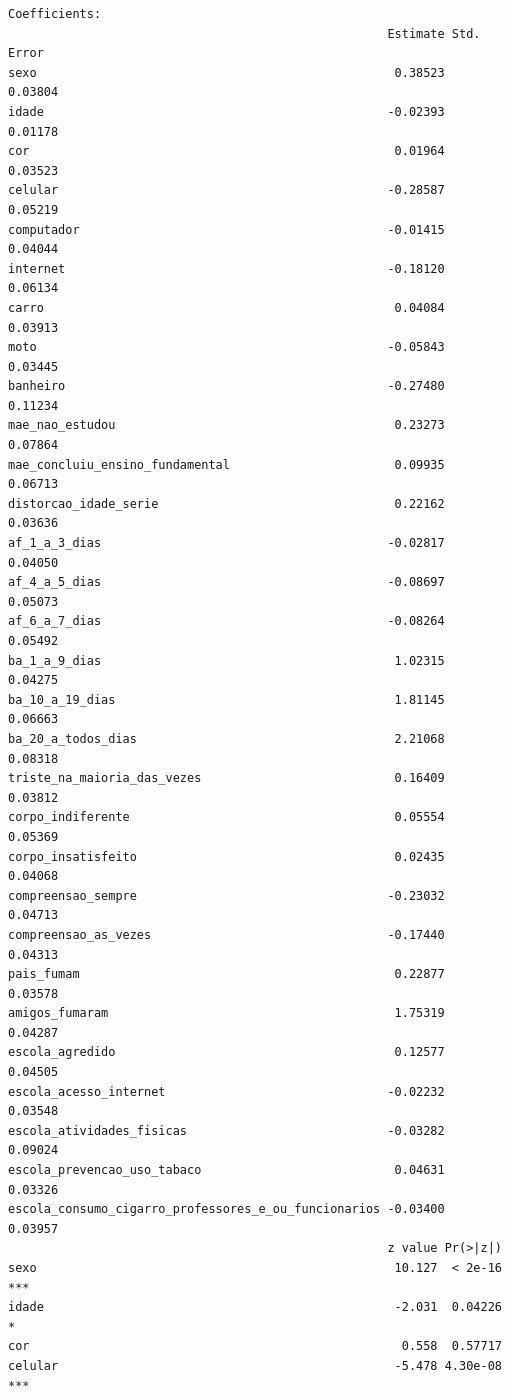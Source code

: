\documentclass[
]{article}
\begin{document}
\begin{verbatim}
Coefficients:
                                                     Estimate Std. Error
sexo                                                  0.38523    0.03804
idade                                                -0.02393    0.01178
cor                                                   0.01964    0.03523
celular                                              -0.28587    0.05219
computador                                           -0.01415    0.04044
internet                                             -0.18120    0.06134
carro                                                 0.04084    0.03913
moto                                                 -0.05843    0.03445
banheiro                                             -0.27480    0.11234
mae_nao_estudou                                       0.23273    0.07864
mae_concluiu_ensino_fundamental                       0.09935    0.06713
distorcao_idade_serie                                 0.22162    0.03636
af_1_a_3_dias                                        -0.02817    0.04050
af_4_a_5_dias                                        -0.08697    0.05073
af_6_a_7_dias                                        -0.08264    0.05492
ba_1_a_9_dias                                         1.02315    0.04275
ba_10_a_19_dias                                       1.81145    0.06663
ba_20_a_todos_dias                                    2.21068    0.08318
triste_na_maioria_das_vezes                           0.16409    0.03812
corpo_indiferente                                     0.05554    0.05369
corpo_insatisfeito                                    0.02435    0.04068
compreensao_sempre                                   -0.23032    0.04713
compreensao_as_vezes                                 -0.17440    0.04313
pais_fumam                                            0.22877    0.03578
amigos_fumaram                                        1.75319    0.04287
escola_agredido                                       0.12577    0.04505
escola_acesso_internet                               -0.02232    0.03548
escola_atividades_fisicas                            -0.03282    0.09024
escola_prevencao_uso_tabaco                           0.04631    0.03326
escola_consumo_cigarro_professores_e_ou_funcionarios -0.03400    0.03957
                                                     z value Pr(>|z|)    
sexo                                                  10.127  < 2e-16 ***
idade                                                 -2.031  0.04226 *  
cor                                                    0.558  0.57717    
celular                                               -5.478 4.30e-08 ***

\end{verbatim}
\end{document}
